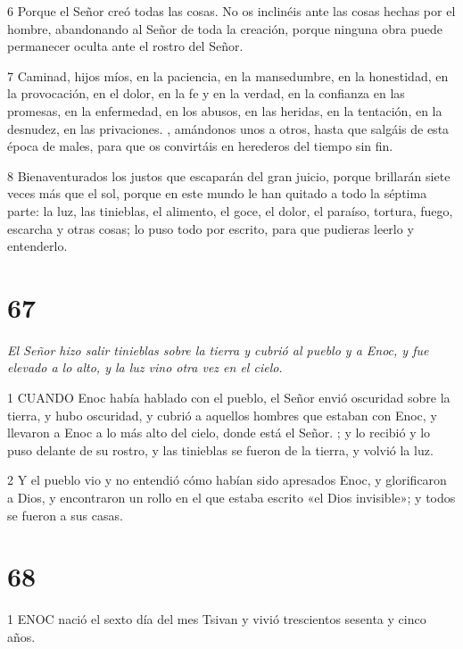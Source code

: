 \par 6 Porque el Señor creó todas las cosas. No os inclinéis ante las cosas hechas por el hombre, abandonando al Señor de toda la creación, porque ninguna obra puede permanecer oculta ante el rostro del Señor.

\par 7 Caminad, hijos míos, en la paciencia, en la mansedumbre, en la honestidad, en la provocación, en el dolor, en la fe y en la verdad, en la confianza en las promesas, en la enfermedad, en los abusos, en las heridas, en la tentación, en la desnudez, en las privaciones. , amándonos unos a otros, hasta que salgáis de esta época de males, para que os convirtáis en herederos del tiempo sin fin.

\par 8 Bienaventurados los justos que escaparán del gran juicio, porque brillarán siete veces más que el sol, porque en este mundo le han quitado a todo la séptima parte: la luz, las tinieblas, el alimento, el goce, el dolor, el paraíso, tortura, fuego, escarcha y otras cosas; lo puso todo por escrito, para que pudieras leerlo y entenderlo.

\chapter{67}

\par \textit{El Señor hizo salir tinieblas sobre la tierra y cubrió al pueblo y a Enoc, y fue elevado a lo alto, y la luz vino otra vez en el cielo.}

\par 1 CUANDO Enoc había hablado con el pueblo, el Señor envió oscuridad sobre la tierra, y hubo oscuridad, y cubrió a aquellos hombres que estaban con Enoc, y llevaron a Enoc a lo más alto del cielo, donde está el Señor. ; y lo recibió y lo puso delante de su rostro, y las tinieblas se fueron de la tierra, y volvió la luz.

\par 2 Y el pueblo vio y no entendió cómo habían sido apresados ​​Enoc, y glorificaron a Dios, y encontraron un rollo en el que estaba escrito «el Dios invisible»; y todos se fueron a sus casas.

\chapter{68}

\par 1 ENOC nació el sexto día del mes Tsivan y vivió trescientos sesenta y cinco años.


